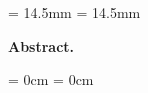 \thispagestyle{plain}

\vspace*{4cm}

\newcommand{\abstractmargin}{14.5mm}

\leftskip  = \abstractmargin
\rightskip = \abstractmargin

\footnotesize
\noindent
\textbf{Abstract.}


\leftskip  = 0cm
\rightskip = 0cm

\newpage
